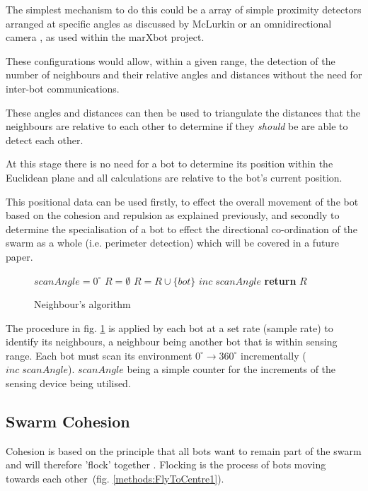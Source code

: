 \documentclass[10pt,journal,letterpaper,twoside]{IEEEtran}
\newcommand{\Fig}{fig.}
\begin{document}
The simplest mechanism to do this could be a array of simple proximity
detectors arranged at specific angles as discussed by McLurkin
\cite{MJ08} or an omnidirectional camera \cite{HSAUAPPRFM11},
\cite{MD07} as used within the marXbot project.

These configurations would allow, within a given range, the detection
of the number of neighbours and their relative angles and distances
without the need for inter-bot communications.

These angles and distances can then be used to triangulate the
distances that the neighbours are relative to each other to determine
if they \textit{should} be are able to detect each other.

At this stage there is no need for a bot to determine its position
within the Euclidean plane and all calculations are relative to the
bot's current position.

This positional data can be used firstly, to effect the overall
movement of the bot based on the cohesion and repulsion as explained
previously, and secondly to determine the specialisation of a bot to
effect the directional co-ordination of the swarm as a whole
(i.e. perimeter detection) which will be covered in a future paper.

\begin{figure}[H]
\begin{algorithmic}[1]
\State $scanAngle = 0^\circ$\;
\State $R = \emptyset$\;
 
   
    \State $R = R \cup \{bot\}$\;
  \EndIf
  \State $inc\; scanAngle$
\EndWhile
\State \textbf{return} $R$
\EndProcedure
\end{algorithmic}
\caption{Neighbour's algorithm}\label{algo:neighbourDetect}
\end{figure}

The procedure in \Fig{} \ref{algo:neighbourDetect} is applied by each
bot at a set rate (sample rate) to identify its neighbours, a
neighbour being another bot that is within sensing range. Each bot
must scan its environment $0^\circ \rightarrow 360^\circ$
incrementally ($inc\; scanAngle$). $scanAngle$ being a simple counter
for the increments of the sensing device being utilised.

\subsection{Swarm Cohesion}
Cohesion is based on the principle that all bots want to remain part
of the swarm and will therefore 'flock' together
\cite{VGKP04}. Flocking is the process of bots moving towards each
other~(\Fig{} \ref{methods:FlyToCentre1}).
\end{document}
